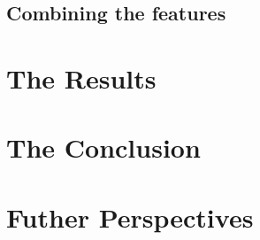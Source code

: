 \documentclass[a4paper]{article}
\begin{document}






\subsection{Combining the features}

\section{The Results}


\section{The Conclusion}

\section{Futher Perspectives}




\end{document}
